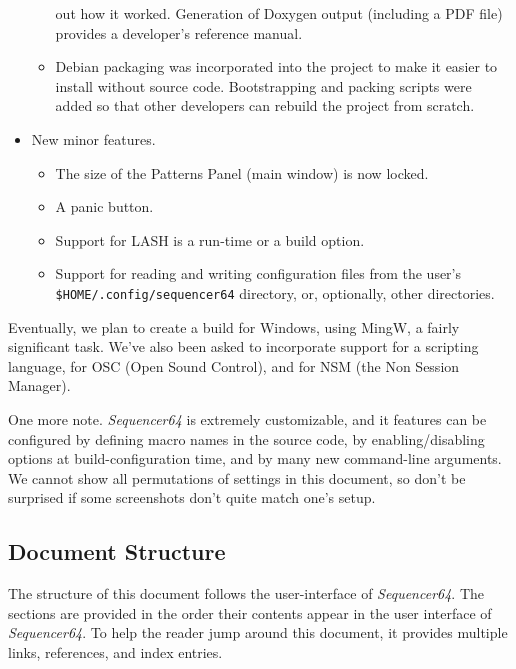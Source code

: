\documentclass[
 11pt,
 twoside,
 a4paper,
 headinclude,
 footinclude,
 final                                 %
]{article}
\begin{document}
\begin{itemize}
\begin{itemize}
            out how it worked.  Generation of Doxygen output (including a PDF
            file) provides a developer's reference manual.
         \item Debian packaging was incorporated into the project to make it
            easier to install without source code.  Bootstrapping and
            packing scripts were added so that other developers can rebuild the
            project from scratch.
      \end{itemize}
      \item New minor features.
      \begin{itemize}
         \item The size of the Patterns Panel (main window) is now locked.
         \item A panic button.
         \item Support for LASH is a run-time or a build option.
         \item Support for reading and writing configuration files from the
            user's \texttt{\$HOME/.config/sequencer64} directory, or,
            optionally, other directories.
      \end{itemize}
   \end{itemize}

   Eventually, we plan to create a build
   for Windows, using MingW, a fairly significant task.
   We've also been asked to incorporate support for 
   a scripting language, for OSC (Open Sound
   Control), and for NSM (the Non Session Manager).

   One more note.  \textsl{Sequencer64} is extremely customizable, and
   it features can be configured by defining macro names in the source code,
   by enabling/disabling options at build-configuration time, and by many new
   command-line arguments.  We cannot show all permutations of settings in this
   document, so don't be surprised if some screenshots don't quite match
   one's setup.

\subsection{Document Structure}
\label{subsec:introduction_document_structure}

   The structure of this document follows the user-interface of
   \textsl{Sequencer64}.  The sections are provided in the order
   their contents appear in the user interface of \textsl{Sequencer64}.  To
   help the reader jump around this document, it provides
   multiple links, references, and index entries.
\end{document}
